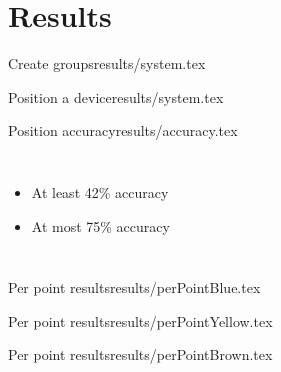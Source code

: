 \section{Results}

\begin{notedFrame}{Create groups}{results/system.tex}
\end{notedFrame}

\begin{notedFrame}{Position a device}{results/system.tex}
\end{notedFrame}

\begin{notedFrame}{Position
accuracy}{results/accuracy.tex}
\begin{columns}[T, onlytextwidth]

		    \begin{itemize}
		        \item At least 42\% accuracy
		        \item At most 75\% accuracy
		    \end{itemize}
\end{columns}
\end{notedFrame}


\begin{notedFrame}{Per point results}{results/perPointBlue.tex}
\end{notedFrame}


\begin{notedFrame}{Per point results}{results/perPointYellow.tex}
\end{notedFrame}


\begin{notedFrame}{Per point results}{results/perPointBrown.tex}
\end{notedFrame}
